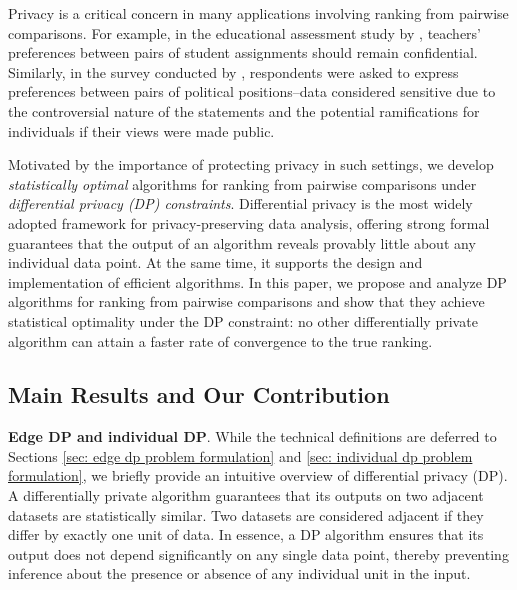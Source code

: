\documentclass[letterpaper,12pt]{article}
\numberwithin{equation}{section}
\theoremstyle{plain}
\numberwithin{Theorem}{section}
\numberwithin{corollary}{section}
\numberwithin{proposition}{section}
\numberwithin{Lemma}{section}
{
	\theoremstyle{definition}
	\newtheorem{Definition}{Definition}
	\newtheorem{example}{Example}
	\numberwithin{example}{section}
	\newtheorem{fact}{Fact}
	\numberwithin{fact}{section}
	\newtheorem{remark}{Remark}
}
\newcommand{\1}{\mathbbm{1}}
\begin{document}
Privacy is a critical concern in many applications involving ranking from pairwise comparisons. For example, in the educational assessment study by \cite{heldsinger2010using}, teachers'  preferences between pairs of student assignments should remain confidential. Similarly, in the survey conducted by \cite{weber2011novel}, respondents were asked to express preferences between pairs of political positions--data considered sensitive due to the controversial nature of the statements and the potential ramifications for individuals if their views were made public.

Motivated by the importance of protecting privacy in such settings, we develop \textit{statistically optimal} algorithms for ranking from pairwise comparisons under \textit{differential privacy (DP) constraints}.  Differential privacy \cite{dwork2006calibrating, dwork2006our} is the most widely adopted framework for privacy-preserving data analysis, offering strong formal guarantees that the output of an algorithm reveals provably little about any individual data point. At the same time, it supports the design and implementation of efficient algorithms. In this paper, we propose and analyze DP algorithms for ranking from pairwise comparisons and show that they achieve statistical optimality under the DP constraint: no other differentially private algorithm can attain a faster rate of convergence to the true ranking.

\subsection{Main Results and Our Contribution}

{\bf Edge DP and individual DP}. While the technical definitions are deferred to Sections \ref{sec: edge dp problem formulation} and \ref{sec: individual dp problem formulation}, we briefly provide an intuitive overview of differential privacy (DP). A differentially private algorithm guarantees that its outputs on two adjacent datasets are statistically similar. Two datasets are considered adjacent if they differ by exactly one unit of data. In essence, a DP algorithm ensures that its output does not depend significantly on any single data point, thereby preventing inference about the presence or absence of any individual unit in the input.
\end{document}
